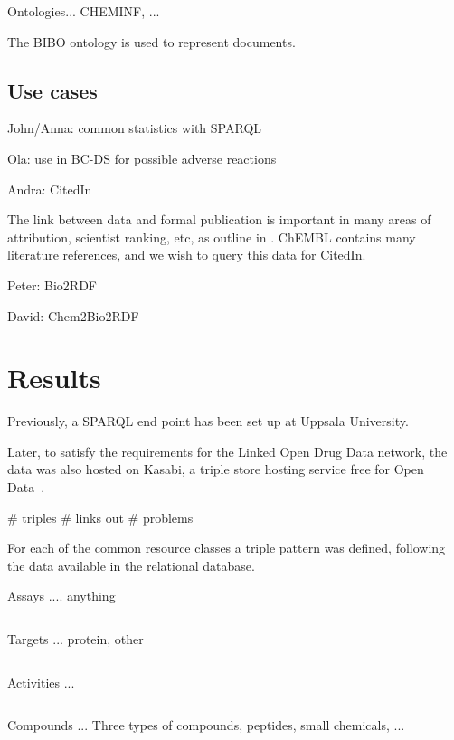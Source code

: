\documentclass[sw]{iosart2c}
\begin{document}
Ontologies... CHEMINF, ...

The BIBO ontology is used to represent documents.

\subsection{Use cases}

John/Anna: common statistics with SPARQL

Ola: use in BC-DS for possible adverse reactions

Andra: CitedIn

The link between data and formal publication is important in many areas of
attribution, scientist ranking, etc, as outline in \cite{Waagmeester2012}.
ChEMBL contains many literature references, and we wish to query this data
for CitedIn.

Peter: Bio2RDF

David: Chem2Bio2RDF

\section{Results}\label{s3}

Previously, a SPARQL end point has been set up at Uppsala University.

Later, to satisfy the requirements for the Linked Open Drug Data \cite{}
network, the data was also hosted on Kasabi, a triple store hosting service
free for Open Data~\cite{}.

\# triples
\# links out
\# problems

For each of the common resource classes a triple pattern was defined, following the
data available in the relational database.

Assays .... anything

\begin{verbatim}
\end{verbatim}

Targets ... protein, other

\begin{verbatim}
\end{verbatim}

Activities ...

\begin{verbatim}
\end{verbatim}

Compounds ... Three types of compounds, peptides, small chemicals, ...
\end{document}
